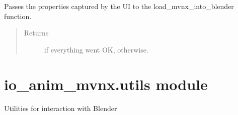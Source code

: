 \documentclass[letterpaper,10pt,english,openany,oneside]{sphinxmanual}
\begin{document}
\begin{fulllineitems}

\begin{fulllineitems}
\label{\detokenize{io_anim_mvnx:io_anim_mvnx.operators.ImportMVNX.bl_rna}}
\end{fulllineitems}


\begin{fulllineitems}
\label{\detokenize{io_anim_mvnx:io_anim_mvnx.operators.ImportMVNX.execute}}
Passes the properties captured by the UI to the load\_mvnx\_into\_blender
function.
\begin{quote}\begin{description}
\item[{Returns}] \leavevmode
{} if everything went OK, 
otherwise.

\end{description}\end{quote}

\end{fulllineitems}


\end{fulllineitems}



\section{io\_anim\_mvnx.utils module}
\label{\detokenize{io_anim_mvnx:module-io_anim_mvnx.utils}}\label{\detokenize{io_anim_mvnx:io-anim-mvnx-utils-module}}
Utilities for interaction with Blender
\end{document}
